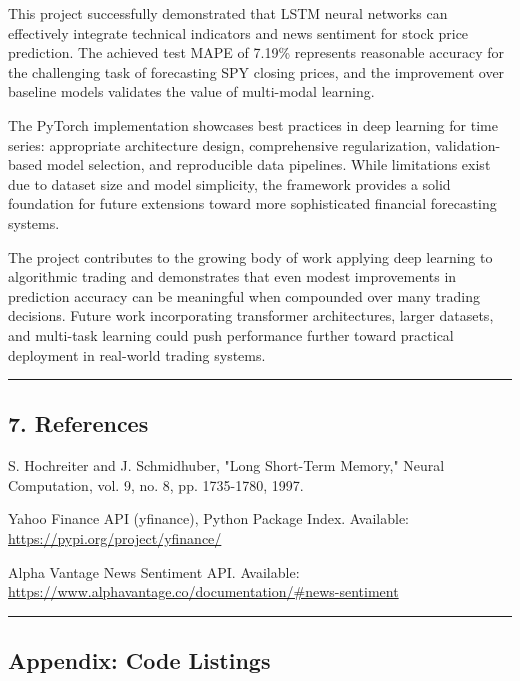 \documentclass[
]{article}
\begin{document}
This project successfully demonstrated that LSTM neural networks can
effectively integrate technical indicators and news sentiment for stock
price prediction. The achieved test MAPE of 7.19\% represents reasonable
accuracy for the challenging task of forecasting SPY closing prices, and
the improvement over baseline models validates the value of multi-modal
learning.

The PyTorch implementation showcases best practices in deep learning for
time series: appropriate architecture design, comprehensive
regularization, validation-based model selection, and reproducible data
pipelines. While limitations exist due to dataset size and model
simplicity, the framework provides a solid foundation for future
extensions toward more sophisticated financial forecasting systems.

The project contributes to the growing body of work applying deep
learning to algorithmic trading and demonstrates that even modest
improvements in prediction accuracy can be meaningful when compounded
over many trading decisions. Future work incorporating transformer
architectures, larger datasets, and multi-task learning could push
performance further toward practical deployment in real-world trading
systems.

\begin{center}\rule{0.5\linewidth}{0.5pt}\end{center}

\subsection{7. References}\label{7-references}

S. Hochreiter and J. Schmidhuber, "Long Short-Term Memory," Neural
Computation, vol. 9, no. 8, pp. 1735-1780, 1997.

Yahoo Finance API (yfinance), Python Package Index. Available:
\url{https://pypi.org/project/yfinance/}

Alpha Vantage News Sentiment API. Available:
\url{https://www.alphavantage.co/documentation/\#news-sentiment}

\begin{center}\rule{0.5\linewidth}{0.5pt}\end{center}

\subsection{Appendix: Code Listings}\label{appendix-code-listings}
\end{document}
